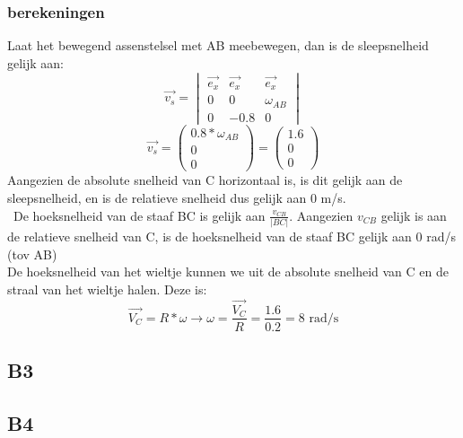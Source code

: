 \documentclass[10pt,a4paper]{article}
\begin{document}
\subsubsection*{berekeningen}
Laat het bewegend assenstelsel met AB meebewegen, dan is de sleepsnelheid gelijk aan:
\[
\vec{v_{s}} =
\begin{vmatrix}
\vec{e_{x}} & \vec{e_{x}} & \vec{e_{x}}\\
0 & 0 & \omega_{AB}\\
0 & -0.8 & 0
\end{vmatrix}
\]
\[
\vec{v_{s}} =
\begin{pmatrix}
0.8*\omega_{AB}\\
0\\
0
\end{pmatrix} = 
\begin{pmatrix}
1.6\\
0\\
0
\end{pmatrix}
\]
Aangezien de absolute snelheid van C horizontaal is, is dit gelijk aan de sleepsnelheid, en is
de relatieve snelheid dus gelijk aan 0 m/s.\\\
De hoeksnelheid van de staaf BC is gelijk aan $\frac{v_{CB}}{|BC|}$. Aangezien $v_{CB}$ gelijk is aan de relatieve snelheid van C, is de hoeksnelheid van de staaf BC gelijk aan 0 rad/s (tov AB)\\

\noindent De hoeksnelheid van het wieltje kunnen we uit de absolute snelheid van C en de straal van het wieltje halen. Deze is:
\[
\vec{V_C} = R*\omega \rightarrow \omega= \frac{\vec{V_C}}{R} = \frac{1.6}{0.2} = \text{8 rad/s}
\]
\subsection{B3}

\subsection{B4}
\end{document}
